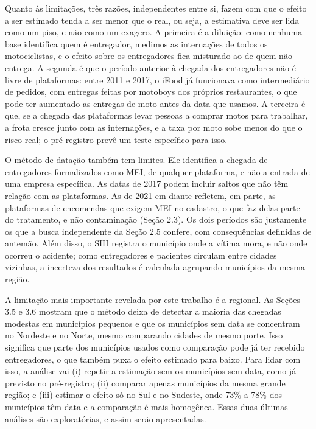 \documentclass[
  11pt,
]{article}
\begin{document}
Quanto às limitações, três razões, independentes entre si, fazem com que o efeito a ser estimado tenda a ser menor que o real, ou seja, a estimativa deve ser lida como um piso, e não como um exagero. A primeira é a diluição: como nenhuma base identifica quem é entregador, medimos as internações de todos os motociclistas, e o efeito sobre os entregadores fica misturado ao de quem não entrega. A segunda é que o período anterior à chegada dos entregadores não é livre de plataformas: entre 2011 e 2017, o iFood já funcionava como intermediário de pedidos, com entregas feitas por motoboys dos próprios restaurantes, o que pode ter aumentado as entregas de moto antes da data que usamos. A terceira é que, se a chegada das plataformas levar pessoas a comprar motos para trabalhar, a frota cresce junto com as internações, e a taxa por moto sobe menos do que o risco real; o pré-registro prevê um teste específico para isso.

O método de datação também tem limites. Ele identifica a chegada de entregadores formalizados como MEI, de qualquer plataforma, e não a entrada de uma empresa específica. As datas de 2017 podem incluir saltos que não têm relação com as plataformas. As de 2021 em diante refletem, em parte, as plataformas de encomendas que exigem MEI no cadastro, o que faz delas parte do tratamento, e não contaminação (Seção 2.3). Os dois períodos são justamente os que a busca independente da Seção 2.5 confere, com consequências definidas de antemão. Além disso, o SIH registra o município onde a vítima mora, e não onde ocorreu o acidente; como entregadores e pacientes circulam entre cidades vizinhas, a incerteza dos resultados é calculada agrupando municípios da mesma região.

A limitação mais importante revelada por este trabalho é a regional. As Seções 3.5 e 3.6 mostram que o método deixa de detectar a maioria das chegadas modestas em municípios pequenos e que os municípios sem data se concentram no Nordeste e no Norte, mesmo comparando cidades de mesmo porte. Isso significa que parte dos municípios usados como comparação pode já ter recebido entregadores, o que também puxa o efeito estimado para baixo. Para lidar com isso, a análise vai (i) repetir a estimação sem os municípios sem data, como já previsto no pré-registro; (ii) comparar apenas municípios da mesma grande região; e (iii) estimar o efeito só no Sul e no Sudeste, onde 73\% a 78\% dos municípios têm data e a comparação é mais homogênea. Essas duas últimas análises são exploratórias, e assim serão apresentadas.
\end{document}
